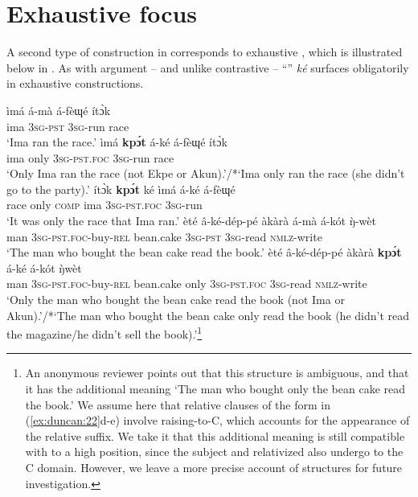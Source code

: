 \documentclass[output=paper,
modfonts
]{langscibook}
\begin{document}
\section{Exhaustive focus}\label{sec:duncan:5}

A second type of  construction in  corresponds to exhaustive , which is illustrated below in . As with argument  – and unlike contrastive   – “” \textit{ké} surfaces obligatorily in exhaustive  constructions.

\ea\label{ex:duncan:22}\settowidth{}
  \ea 
  \gll ìmá á-mà á-fèɰé ít\`{ɔ}k \\
  ima 3\textsc{sg-pst} \textsc{3sg}-run race\\
  \glt ‘Ima ran the race.’
  \ex
  \gll ìmá \textbf{kp\'{ɔ}t} á-ké á-fèɰé ít\`{ɔ}k \\
  ima only 3\textsc{sg-pst.foc} 3\textsc{sg}-run race\\
  \glt ‘Only Ima ran the race (not Ekpe or Akun).’/*‘Ima only ran the race (she didn’t go to the party).’
  \ex
  \gll ít\`{ɔ}k \textbf{kp\'{ɔ}t} ké ìmá á-ké á-fèɰé \\
  race only \textsc{comp} ima \textsc{3sg-pst.foc} 3\textsc{sg-}run\\
  \glt ‘It was only the race that Ima ran.’
  \ex 
  \gll èté â-ké-dép-pé àkàrà á-mà á-kót \`{ŋ}-wèt\\
  man 3\textsc{sg-pst.foc}-buy-\textsc{rel} bean.cake 3\textsc{sg-pst} \textsc{3sg}-read \textsc{nmlz}-write\\
  \glt ‘The man who bought the bean cake read the book.’
  \ex \label{ex:duncan:22e} 
  \gll  èté â-ké-dép-pé àkàrà \textbf{kp\'{ɔ}t} á-ké á-kót \`{ŋ}wèt\\
  man 3\textsc{sg-pst.foc}-buy-\textsc{rel} bean.cake only 3\textsc{sg-pst.foc} 3\textsc{sg}-read \textsc{nmlz}-write\\
  \glt ‘Only the man who bought the bean cake read the book (not Ima or Akun).’/*‘The man who bought the bean cake only read the book (he didn’t read the magazine/he didn’t sell the book).’\footnote{An anonymous reviewer points out that this structure is ambiguous, and that it has the additional meaning ‘The man who bought only the bean cake read the book.’ We assume here that relative clauses of the form in (\ref{ex:duncan:22}d-e) involve raising-to-C, which accounts for the appearance of the relative suffix. We take it that this additional meaning is still compatible with  to a high  position, since the subject and relativized  also undergo  to the C domain. However, we leave a more precise account of  structures for future investigation.}
  \z
\z
\end{document}

